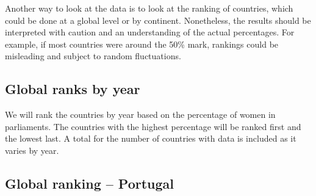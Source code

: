 \documentclass[a4paper,9pt,twocolumn,twoside,printwatermark=false]{pinp}
\begin{document}
Another way to look at the data is to look at the ranking of countries,
which could be done at a global level or by continent. Nonetheless, the
results should be interpreted with caution and an understanding of the
actual percentages. For example, if most countries were around the 50\%
mark, rankings could be misleading and subject to random fluctuations.

\subsection{Global ranks by year}\label{global-ranks-by-year}

We will rank the countries by year based on the percentage of women in
parliaments. The countries with the highest percentage will be ranked
first and the lowest last. A total for the number of countries with data
is included as it varies by year.

\begin{Shaded}
\begin{Highlighting}[]
\NormalTok{cWP[}\OperatorTok{!}
    \DataTypeTok{:=}\NormalTok{(} \NormalTok{(}\OperatorTok{-}
\StringTok{ }\NormalTok{.(Year)]}
\end{Highlighting}
\end{Shaded}

\subsection{Global ranking -- Portugal}\label{global-ranking-portugal}
\end{document}
